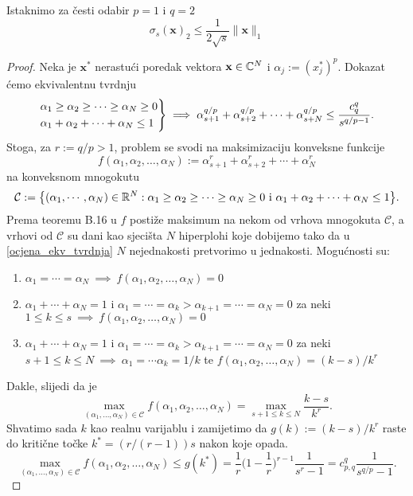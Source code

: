 \documentclass[a4paper,twoside,12pt]{memoir} %
\newcommand{\vect}[1]{\mathbf{#1}}
\renewcommand{\vec}{\vect}
\begin{document}
Istaknimo za \v{c}esti odabir $p=1$ i $q=2$
\begin{equation*}
    \sigma_s(\vec{x})_2 \leq \frac{1}{2\sqrt{s}}\|\vec{x}\|_1
\end{equation*}
\begin{proof}
    Neka je $\vec{x}^*$ nerastu\'ci poredak vektora $\vec{x}\in\C^N$ i $\alpha_j := (x_j^*)^p$. Dokazat \'cemo ekvivalentnu tvrdnju
    \begin{equation}\label{ocjena_ekv_tvrdnja}
    \begin{rcases}
{\alpha_1 \geq \alpha_2 \geq \cdots \geq \alpha_N \geq 0} \\
{\alpha_1 + \alpha_2 + \cdots + \alpha_N \leq 1} 
\end{rcases}\implies \alpha_{s+1}^{q/p} + \alpha_{s+2}^{q/p} + \cdots + \alpha_{s+N}^{q/p} \leq \frac{c^q_{q}}{s^{q/p-1}}.
    \end{equation}
    Stoga, za $r:=q/p>1$, problem se svodi na maksimizaciju konveksne funkcije
    $$
    f(\alpha_1, \alpha_2, \dots, \alpha_N) := \alpha_{s+1}^r + \alpha_{s+2}^r + \cdots +\alpha_{N}^r
    $$
    na konveksnom mnogokutu
    $$
    \mathcal{C} := \big\{ (\alpha_1, \cdots, \alpha_N)\in \mathbb{R}^N :  \alpha_1 \geq \alpha_2 \geq \cdots \geq \alpha_N \geq 0 \text{ i }  \alpha_1 + \alpha_2 + \cdots + \alpha_N \leq 1\big\}.
    $$
    Prema teoremu B.16 u \cite{foucart13} $f$ posti\v{z}e maksimum na nekom od vrhova mnogokuta $\mathcal{C}$, a vrhovi od $\mathcal{C}$ su dani kao sjeci\v{s}ta  $N$ hiperplohi koje dobijemo tako da u \eqref{ocjena_ekv_tvrdnja} $N$ nejednakosti pretvorimo u jednakosti. Mogu\'cnosti su:
    \begin{enumerate}
        \item $\alpha_1=\cdots=\alpha_N \ \implies\  f(\alpha_1, \alpha_2, \dots, \alpha_N) = 0$
        \item $\alpha_1+\cdots+\alpha_N=1$ i $\alpha_1=\cdots=\alpha_k>\alpha_{k+1}=\cdots=\alpha_N=0$ za neki \\ $1\leq k \leq s \  \implies \  f(\alpha_1, \alpha_2, \dots, \alpha_N) = 0$
        \item $\alpha_1+\cdots+\alpha_N=1$ i $\alpha_1=\cdots=\alpha_k>\alpha_{k+1}=\cdots=\alpha_N=0$ za neki\\ $s+1\leq k \leq N \  \implies \  \alpha_1=\cdots\alpha_k=1/k$ te $f(\alpha_1, \alpha_2, \dots, \alpha_N) = (k-s)/k^r$
    \end{enumerate}
    Dakle, slijedi da je
    $$
    \max\limits_{(\alpha_1,\dots,\alpha_N)\in\mathcal{C}} f(\alpha_1, \alpha_2, \dots, \alpha_N) = \max\limits_{s+1\leq k \leq N} \frac{k-s}{k^r}.
    $$
    Shvatimo sada $k$ kao realnu varijablu i zamijetimo da $g(k):=(k-s)/k^r$ raste do kriti\v{c}ne to\v{c}ke $k^*=(r/(r-1))s$ nakon koje opada.
    $$
    \max\limits_{(\alpha_1,\dots,\alpha_N)\in\mathcal{C}} f(\alpha_1, \alpha_2, \dots, \alpha_N) \leq g(k^*) = \frac{1}{r}\bigg( 1- \frac{1}{r}\bigg)^{r-1}\frac{1}{s^r-1}=c^q_{p,q}\frac{1}{s^{q/p}-1}.
    $$
\end{proof}
\end{document}
